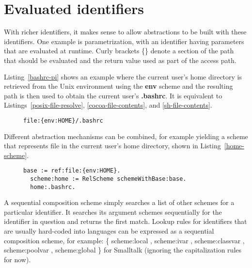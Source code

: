 \documentclass[preprint,authoryear]{acm_proc_article-sp}
\begin{document}
\section{Evaluated identifiers}

With richer identifiers, it makes sense to allow abstractions to be built with these identifiers.
One example is parametrization, with an identifier having parameters that are evaluated
at runtime.  Curly brackets \{\} denote a section of the path that should be evaluated and
the return value used as part of the access path.

Listing~\ref{bashrc-pi} shows an example where the current user's home directory
is retrieved from the Unix environment using the {\bf env} scheme and the resulting
path is then used to obtain the current user's  {\bf .bashrc}.
It is equivalent to Listings~\ref{posix-file-resolve}, \ref{cocoa-file-contents}, and 
\ref{sh-file-contents}.

\begin{figure}[htbp]
\begin{lstlisting}[style=L,label=bashrc-pi,caption=Parametrized identifier.]
  file:{env:HOME}/.bashrc
\end{lstlisting}
\end{figure}


Different abstraction mechanisms can be combined, for example yielding
a scheme that represents file in the current user's home directory, shown
in Listing~\ref{home-scheme}.


\begin{figure}[htbp]
\begin{lstlisting}[style=L,label=home-scheme,caption=Accessing .bashrc via custom home: scheme.]
  base := ref:file:{env:HOME}.
  scheme:home := RelScheme schemeWithBase:base.
  home:.bashrc.
\end{lstlisting}
\end{figure}

A sequential composition scheme simply searches a list of other schemes
for a particular identifier.  It searches its argument schemes sequentially
for the identifier in question and returns the first match.  Lookup rules for
identifiers that are usually hard-coded into languages can be expressed
as a sequential composition scheme, for example:   \{ scheme:local ,
scheme:ivar , scheme:classvar , scheme:poolvar , scheme:global \} for Smalltalk 
(ignoring the capitalization rules for now).

\end{document}
